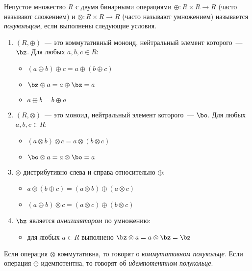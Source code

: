 \begin{definition}[Полукольцо]
    Непустое множество $R$ с двумя бинарными операциями $\oplus: R \times R \to R$ (часто называют сложением) и $\otimes: R \times R \to R$ (часто называют умножением) называется \emph{полукольцом}, если выполнены следующие условия.
    \begin{enumerate}
        \item $(R, \oplus)$~--- это коммутативный моноид, нейтральный элемент которого~--- $\bz$. Для любых $a, b, c \in R$:
              \begin{itemize}
                  \item $(a \oplus b) \oplus c = a \oplus (b \oplus c)$
                  \item $\bz \oplus a = a \oplus \bz = a$
                  \item $a \oplus b = b \oplus a$
              \end{itemize}
        \item $(R, \otimes)$~--- это моноид, нейтральный элемент которого~--- $\bo$. Для любых $a, b, c \in R$:
              \begin{itemize}
                  \item $(a \otimes b) \otimes c = a \otimes (b \otimes c)$
                  \item $\bo \otimes a = a \otimes \bo = a$
              \end{itemize}
        \item $\otimes$ дистрибутивно слева и справа относительно $\oplus$:
              \begin{itemize}
                  \item $a \otimes (b \oplus c) = (a \otimes b) \oplus (a \otimes c)$
                  \item $(a \oplus b) \otimes c = (a \otimes c) \oplus (b \otimes c)$
              \end{itemize}
        \item $\bz$ является \emph{аннигилятором} по умножению:
              \begin{itemize}
                  \item для любых $a \in R$ выполнено $\bz \otimes a = a \otimes \bz = \bz$
              \end{itemize}
    \end{enumerate}
    Если операция $\otimes$ коммутативна, то говорят о \emph{коммутативном полукольце}.
    Если операция $\oplus$ идемпотентна, то говорят об \emph{идемпотентном полукольце}.
\end{definition}

